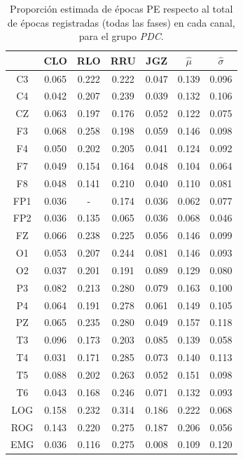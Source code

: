 \begin{table}
\centering
\begin{tabular}{c|cccc|cc}
& CLO & RLO & RRU & JGZ & $\widehat{\mu}$ & $\widehat{\sigma}$ \\
\hline
 C3 & 0.065    & 0.222    & 0.222    & 0.047    & 0.139    & 0.096     \\
 C4 & 0.042    & 0.207    & 0.239    & 0.039    & 0.132    & 0.106     \\
 CZ & 0.063    & 0.197    & 0.176    & 0.052    & 0.122    & 0.075     \\
 F3 & 0.068    & 0.258    & 0.198    & 0.059    & 0.146    & 0.098     \\
 F4 & 0.050    & 0.202    & 0.205    & 0.041    & 0.124    & 0.092     \\
 F7 & 0.049    & 0.154    & 0.164    & 0.048    & 0.104    & 0.064     \\
 F8 & 0.048    & 0.141    & 0.210    & 0.040    & 0.110    & 0.081     \\
 FP1 & 0.036    & -      & 0.174    & 0.036    & 0.062    & 0.077     \\
 FP2 & 0.036    & 0.135    & 0.065    & 0.036    & 0.068    & 0.046     \\
 FZ & 0.066    & 0.238    & 0.225    & 0.056    & 0.146    & 0.099     \\
 O1 & 0.053    & 0.207    & 0.244    & 0.081    & 0.146    & 0.093     \\
 O2 & 0.037    & 0.201    & 0.191    & 0.089    & 0.129    & 0.080     \\
 P3 & 0.082    & 0.213    & 0.280    & 0.079    & 0.163    & 0.100     \\
 P4 & 0.064    & 0.191    & 0.278    & 0.061    & 0.149    & 0.105     \\
 PZ & 0.065    & 0.235    & 0.280    & 0.049    & 0.157    & 0.118     \\
 T3 & 0.096    & 0.173    & 0.203    & 0.085    & 0.139    & 0.058     \\
 T4 & 0.031    & 0.171    & 0.285    & 0.073    & 0.140    & 0.113     \\
 T5 & 0.088    & 0.202    & 0.263    & 0.052    & 0.151    & 0.098     \\
 T6 & 0.043    & 0.168    & 0.246    & 0.071    & 0.132    & 0.093     \\
 LOG & 0.158    & 0.232    & 0.314    & 0.186    & 0.222    & 0.068     \\
 ROG & 0.143    & 0.220    & 0.275    & 0.187    & 0.206    & 0.056     \\
 EMG & 0.036    & 0.116    & 0.275    & 0.008    & 0.109    & 0.120   
\end{tabular}
\caption{Proporci\'on estimada de \'epocas PE respecto al total de \'epocas
registradas (todas las fases) en cada
canal, para el grupo \textit{PDC}.}
\label{gpo_mn_tot}
\end{table}


